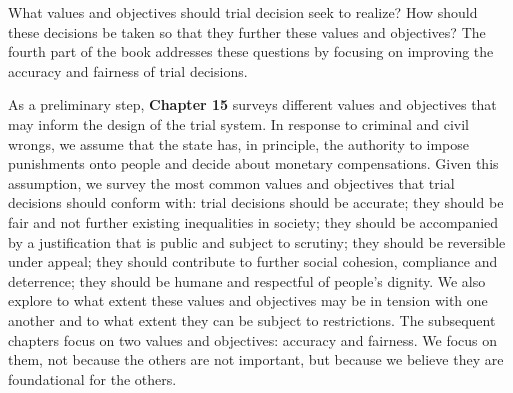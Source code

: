 \documentclass[
  10pt,
  dvipsnames,enabledeprecatedfontcommands]{scrartcl}
\begin{document}
\noindent What values and objectives should trial decision seek to
realize? How should these decisions be taken so that they further these
values and objectives? The fourth part of the book addresses these
questions by focusing on improving the accuracy and fairness of trial
decisions.

As a preliminary step, \textbf{Chapter 15} surveys different values and
objectives that may inform the design of the trial system. In response
to criminal and civil wrongs, we assume that the state has, in
principle, the authority to impose punishments onto people and decide
about monetary compensations. Given this assumption, we survey the most
common values and objectives that trial decisions should conform with:
trial decisions should be accurate; they should be fair and not further
existing inequalities in society; they should be accompanied by a
justification that is public and subject to scrutiny; they should be
reversible under appeal; they should contribute to further social
cohesion, compliance and deterrence; they should be humane and
respectful of people's dignity. We also explore to what extent these
values and objectives may be in tension with one another and to what
extent they can be subject to restrictions. The subsequent chapters
focus on two values and objectives: accuracy and fairness. We focus on
them, not because the others are not important, but because we believe
they are foundational for the others.
\end{document}
